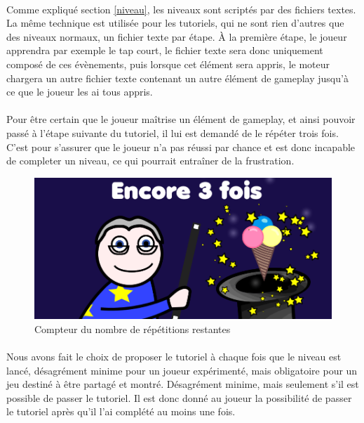\paragraph{}
Comme expliqué section \ref{niveau}, les niveaux sont scriptés par des fichiers textes. La même technique est utilisée pour les tutoriels, qui ne sont rien d'autres que des niveaux normaux, un fichier texte par étape. À la première étape, le joueur apprendra par exemple le tap court, le fichier texte sera donc uniquement composé de ces évènements, puis lorsque cet élément sera appris, le moteur chargera un autre fichier texte contenant un autre élément de gameplay jusqu'à ce que le joueur les ai tous appris.

\paragraph{}
Pour être certain que le joueur maîtrise un élément de gameplay, et ainsi pouvoir passé à l'étape suivante du tutoriel, il lui est demandé de le répéter trois fois. C'est pour s'assurer que le joueur n'a pas réussi par chance et est donc incapable de completer un niveau, ce qui pourrait entraîner de la frustration.


\begin{figure}[H]\centering
  \includegraphics[scale=0.28]{./img/compteur_tuto.png}
  \caption{Compteur du nombre de répétitions restantes}
  \label{repetitions}
\end{figure}

\paragraph{}
Nous avons fait le choix de proposer le tutoriel à chaque fois que le niveau est lancé, désagrément minime pour un joueur expérimenté, mais obligatoire pour un jeu destiné à être partagé et montré. Désagrément minime, mais seulement s'il est possible de passer le tutoriel. Il est donc donné au joueur la possibilité de passer le tutoriel après qu'il l'ai complété au moins une fois.

